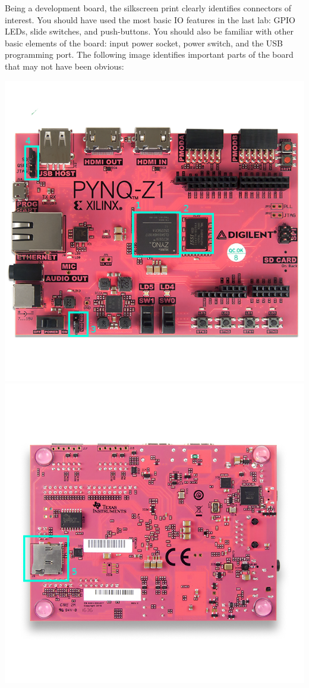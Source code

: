 \documentclass[11pt]{article}
\begin{document}
Being a development board, the silkscreen print clearly identifies connectors of interest. You should have used the most basic IO features in the last lab: GPIO LEDs, slide switches, and push-buttons. You should also be familiar with other basic elements of the board: input power socket, power switch, and the USB programming port. The following image identifies important parts of the board that may not have been obvious:

\includegraphics[width=\textwidth]{figs/z1_top_annotated.png}
\includegraphics[width=\textwidth]{figs/z1_bottom_annotated.png}
\end{document}
